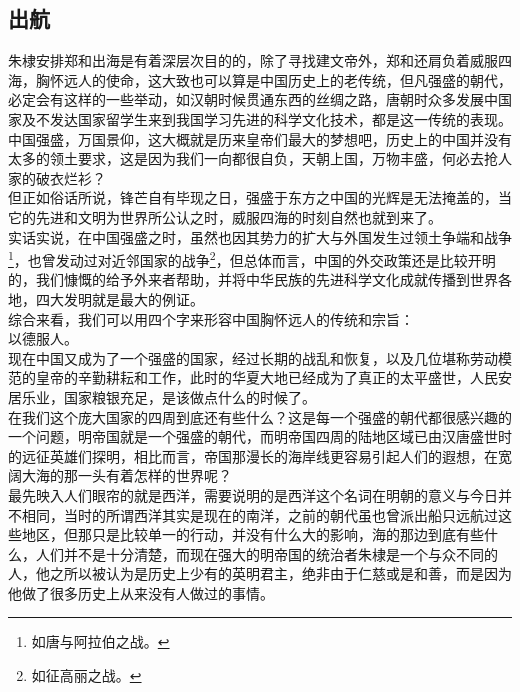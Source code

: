 \begin{multicols}{\theparacolNo}
\subsection{出航}
朱棣安排郑和出海是有着深层次目的的，除了寻找建文帝外，郑和还肩负着威服四海，胸怀远人的使命，这大致也可以算是中国历史上的老传统，但凡强盛的朝代，必定会有这样的一些举动，如汉朝时候贯通东西的丝绸之路，唐朝时众多发展中国家及不发达国家留学生来到我国学习先进的科学文化技术，都是这一传统的表现。\\

中国强盛，万国景仰，这大概就是历来皇帝们最大的梦想吧，历史上的中国并没有太多的领土要求，这是因为我们一向都很自负，天朝上国，万物丰盛，何必去抢人家的破衣烂衫？\\

但正如俗话所说，锋芒自有毕现之日，强盛于东方之中国的光辉是无法掩盖的，当它的先进和文明为世界所公认之时，威服四海的时刻自然也就到来了。\\

实话实说，在中国强盛之时，虽然也因其势力的扩大与外国发生过领土争端和战争\footnote{如唐与阿拉伯之战。}，也曾发动过对近邻国家的战争\footnote{如征高丽之战。}，但总体而言，中国的外交政策还是比较开明的，我们慷慨的给予外来者帮助，并将中华民族的先进科学文化成就传播到世界各地，四大发明就是最大的例证。\\

综合来看，我们可以用四个字来形容中国胸怀远人的传统和宗旨：\\

以德服人。\\

现在中国又成为了一个强盛的国家，经过长期的战乱和恢复，以及几位堪称劳动模范的皇帝的辛勤耕耘和工作，此时的华夏大地已经成为了真正的太平盛世，人民安居乐业，国家粮银充足，是该做点什么的时候了。\\

在我们这个庞大国家的四周到底还有些什么？这是每一个强盛的朝代都很感兴趣的一个问题，明帝国就是一个强盛的朝代，而明帝国四周的陆地区域已由汉唐盛世时的远征英雄们探明，相比而言，帝国那漫长的海岸线更容易引起人们的遐想，在宽阔大海的那一头有着怎样的世界呢？\\

最先映入人们眼帘的就是西洋，需要说明的是西洋这个名词在明朝的意义与今日并不相同，当时的所谓西洋其实是现在的南洋，之前的朝代虽也曾派出船只远航过这些地区，但那只是比较单一的行动，并没有什么大的影响，海的那边到底有些什么，人们并不是十分清楚，而现在强大的明帝国的统治者朱棣是一个与众不同的人，他之所以被认为是历史上少有的英明君主，绝非由于仁慈或是和善，而是因为他做了很多历史上从来没有人做过的事情。\\


\end{multicols}
